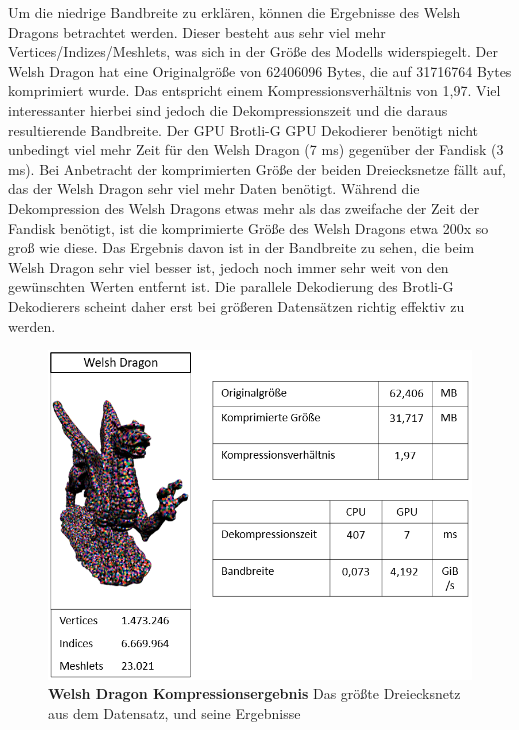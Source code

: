 Um die niedrige Bandbreite zu erklären, können die Ergebnisse des Welsh Dragons betrachtet werden. 
Dieser besteht aus sehr viel mehr Vertices/Indizes/Meshlets, was sich in der Größe des Modells widerspiegelt. 
Der Welsh Dragon hat eine Originalgröße von 62406096 Bytes, die auf 31716764 Bytes komprimiert wurde. 
Das entspricht einem Kompressionsverhältnis von 1,97.
Viel interessanter hierbei sind jedoch die Dekompressionszeit und die daraus resultierende Bandbreite. 
Der GPU Brotli-G GPU Dekodierer benötigt nicht unbedingt viel mehr Zeit für den Welsh Dragon (7 ms) gegenüber der Fandisk (3 ms).
Bei Anbetracht der komprimierten Größe der beiden Dreiecksnetze fällt auf, das der Welsh Dragon sehr viel mehr Daten benötigt. 
Während die Dekompression des Welsh Dragons etwas mehr als das zweifache der Zeit der Fandisk benötigt, ist die komprimierte Größe des Welsh Dragons etwa 200x so groß wie diese.
Das Ergebnis davon ist in der Bandbreite zu sehen, die beim Welsh Dragon sehr viel besser ist, jedoch noch immer sehr weit von den gewünschten Werten entfernt ist.
Die parallele Dekodierung des Brotli-G Dekodierers scheint daher erst bei größeren Datensätzen richtig effektiv zu werden.

\begin{figure}[htb]
  \centering  
  \includegraphics[scale=0.75]{Bilder/ergebnisse/welshdragon.png}
  \caption[Welsh Dragon Kompressionsergebnis]{\textbf{Welsh Dragon Kompressionsergebnis} Das größte Dreiecksnetz aus dem Datensatz, und seine Ergebnisse}
  \label{fig:mesh_shading_pipeline}
\end{figure}

